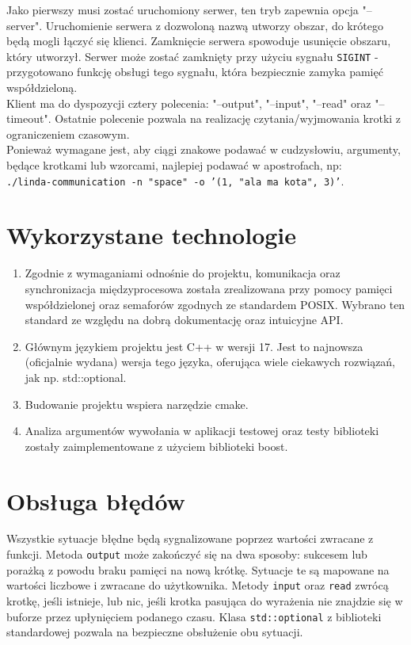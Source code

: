 \documentclass[a4paper]{article}
\begin{document}
	Jako pierwszy musi zostać uruchomiony serwer, ten tryb zapewnia opcja "--server". Uruchomienie serwera z dozwoloną nazwą utworzy obszar, do krótego będą mogli łączyć się klienci. Zamknięcie serwera spowoduje usunięcie obszaru, który utworzył. Serwer może zostać zamknięty przy użyciu sygnału \texttt{SIGINT} - przygotowano funkcję obsługi tego sygnału, która bezpiecznie zamyka pamięć współdzieloną.\\
	
	Klient ma do dyspozycji cztery polecenia: "--output", "--input", "--read" oraz "--timeout". Ostatnie polecenie pozwala na realizację czytania/wyjmowania krotki z ograniczeniem czasowym.\\
	
	Ponieważ wymagane jest, aby ciągi znakowe podawać w cudzysłowiu, argumenty, będące krotkami lub wzorcami, najlepiej podawać w apostrofach, np:\\ \texttt{./linda-communication -n "space" -o '(1, "ala ma kota", 3)'}.
	
	\section{Wykorzystane technologie}
	\begin{enumerate}
		\item Zgodnie z wymaganiami odnośnie do projektu, komunikacja oraz synchronizacja międzyprocesowa została zrealizowana przy pomocy pamięci współdzielonej oraz semaforów zgodnych ze standardem POSIX. Wybrano ten standard ze względu na dobrą dokumentację oraz intuicyjne API.
		\item Głównym językiem projektu jest C++ w wersji 17. Jest to najnowsza (oficjalnie wydana) wersja tego języka, oferująca wiele ciekawych rozwiązań, jak np. std::optional.
		\item Budowanie projektu wspiera narzędzie cmake.
		\item Analiza argumentów wywołania w aplikacji testowej oraz testy biblioteki zostały zaimplementowane z użyciem biblioteki boost. 
	\end{enumerate}
	

	\section{Obsługa błędów}
	Wszystkie sytuacje błędne będą sygnalizowane poprzez wartości zwracane z funkcji.
	Metoda \texttt{output} może zakończyć się na dwa sposoby: sukcesem lub porażką z powodu braku pamięci na nową krótkę. Sytuacje te są mapowane na wartości liczbowe i zwracane do użytkownika.
	Metody \texttt{input} oraz \texttt{read} zwrócą krotkę, jeśli istnieje, lub nic, jeśli krotka pasująca do wyrażenia nie znajdzie się w buforze przez upłynięciem podanego czasu. Klasa \texttt{std::optional} z biblioteki standardowej pozwala na bezpieczne obsłużenie obu sytuacji.
	
\end{document}
